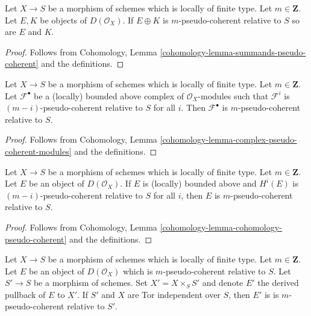 \begin{lemma}
\label{lemma-summands-relative-pseudo-coherent}
Let $X \to S$ be a morphism of schemes which is locally of finite type.
Let $m \in \mathbf{Z}$. Let $E, K$ be objects of $D(\mathcal{O}_X)$.
If $E \oplus K$ is $m$-pseudo-coherent relative to $S$ so are $E$ and $K$.
\end{lemma}

\begin{proof}
Follows from
Cohomology, Lemma \ref{cohomology-lemma-summands-pseudo-coherent}
and the definitions.
\end{proof}

\begin{lemma}
\label{lemma-complex-relative-pseudo-coherent-modules}
Let $X \to S$ be a morphism of schemes which is locally of finite type.
Let $m \in \mathbf{Z}$. Let $\mathcal{F}^\bullet$ be a (locally) bounded
above complex of $\mathcal{O}_X$-modules such that $\mathcal{F}^i$ is
$(m - i)$-pseudo-coherent relative to $S$ for all $i$. Then
$\mathcal{F}^\bullet$ is $m$-pseudo-coherent relative to $S$.
\end{lemma}

\begin{proof}
Follows from
Cohomology, Lemma \ref{cohomology-lemma-complex-pseudo-coherent-modules}
and the definitions.
\end{proof}

\begin{lemma}
\label{lemma-cohomology-relative-pseudo-coherent}
Let $X \to S$ be a morphism of schemes which is locally of finite type.
Let $m \in \mathbf{Z}$. Let $E$ be an object of $D(\mathcal{O}_X)$.
If $E$ is (locally) bounded above and $H^i(E)$ is $(m - i)$-pseudo-coherent
relative to $S$ for all $i$, then $E$ is $m$-pseudo-coherent relative to $S$.
\end{lemma}

\begin{proof}
Follows from
Cohomology, Lemma \ref{cohomology-lemma-cohomology-pseudo-coherent}
and the definitions.
\end{proof}

\begin{lemma}
\label{lemma-base-change-relative-pseudo-coherent}
Let $X \to S$ be a morphism of schemes which is locally of finite type.
Let $m \in \mathbf{Z}$. Let $E$ be an object of $D(\mathcal{O}_X)$
which is $m$-pseudo-coherent relative to $S$. Let $S' \to S$ be a
morphism of schemes. Set $X' = X \times_S S'$ and denote $E'$
the derived pullback of $E$ to $X'$. If $S'$ and $X$ are
Tor independent over $S$, then $E'$ is
is $m$-pseudo-coherent relative to $S'$.
\end{lemma}

